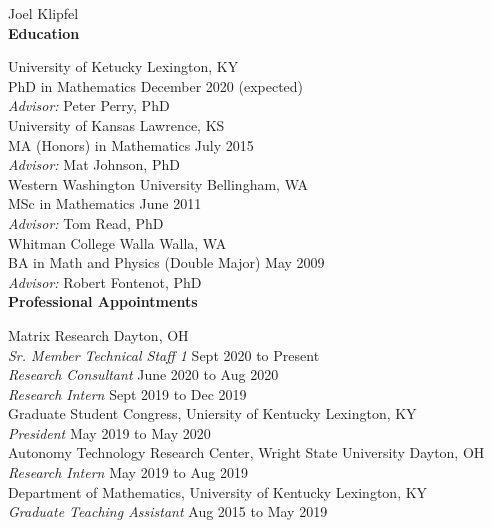 \documentclass[dissertation.tex]{subfiles}
\begin{document}
\noindent Joel Klipfel \\

\noi\textbf{Education}

\noi{}University of Ketucky \hfill Lexington, KY \\
\noi{}PhD in Mathematics \hfill December 2020 (expected) \\
\noi\textit{Advisor:} Peter Perry, PhD\\

\noi{}University of Kansas \hfill Lawrence, KS \\
\noi{}MA (Honors) in Mathematics \hfill July 2015 \\
\noi\textit{Advisor:} Mat Johnson, PhD\\

\noi{}Western Washington University \hfill Bellingham, WA\\
\noi{}MSc in Mathematics \hfill June 2011\\
\noi\textit{Advisor:} Tom Read, PhD \\

\noi{}Whitman College \hfill Walla Walla, WA\\
\noi{}BA in Math and Physics (Double Major) \hfill May 2009\\
\noi\textit{Advisor:} Robert Fontenot, PhD \\

\noi\textbf{Professional Appointments}

\noi{}Matrix Research \hfill Dayton, OH \\
\noi{}\textit{Sr. Member Technical Staff 1} \hfill Sept 2020 to Present \\
\noi{}\textit{Research Consultant} \hfill June 2020 to Aug 2020 \\
\noi{}\textit{Research Intern} \hfill Sept 2019 to Dec 2019 \\

\noi{}Graduate Student Congress, Uniersity of Kentucky \hfill Lexington, KY \\
\noi{}\textit{President} \hfill May 2019 to May 2020 \\

\noi{}Autonomy Technology Research Center, Wright State University \hfill Dayton, OH \\
\noi{}\textit{Research Intern} \hfill May 2019 to Aug 2019 \\

\noi{}Department of Mathematics, University of Kentucky \hfill Lexington, KY \\
\noi{}\textit{Graduate Teaching Assistant} \hfill Aug 2015 to May 2019 \\
\end{document}
